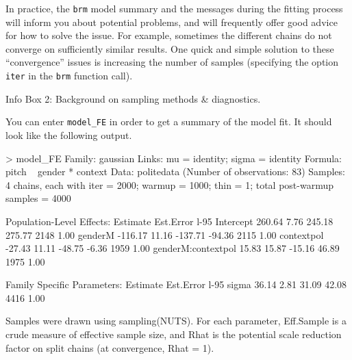 \documentclass[nobib]{tufte-handout}
\begin{document}
\begin{InfoBox}[]
{\begin{minipage}{1\textwidth}
    \medskip
  
    In practice, the \texttt{brm} model summary and the messages during the fitting process will inform you about potential problems, and will frequently offer good advice for how to solve the issue. 
   For example, sometimes the different chains do not converge on sufficiently similar results. 
    One quick and simple solution to these ``convergence'' issues is increasing the number of samples (specifying the option \texttt{iter} in the \texttt{brm} function call).
   
  \end{minipage} \par
  } \par
  \begin{center}
    Info Box 2: Background on sampling methods \& diagnostics.
  \end{center}
\end{InfoBox}


You can enter \texttt{model\_FE} in order to get a summary of the model fit. It should look like the following output.

\bigskip

\begin{minipage}[]{1.2\textwidth}
\begin{rc}
> model_FE
 Family: gaussian 
  Links: mu = identity; sigma = identity 
Formula: pitch ~ gender * context 
   Data: politedata (Number of observations: 83) 
Samples: 4 chains, each with iter = 2000; warmup = 1000; thin = 1;
         total post-warmup samples = 4000

Population-Level Effects: 
                   Estimate Est.Error l-95%
Intercept            260.64      7.76   245.18   275.77       2148 1.00
genderM             -116.17     11.16  -137.71   -94.36       2115 1.00
contextpol           -27.43     11.11   -48.75    -6.36       1959 1.00
genderM:contextpol    15.83     15.87   -15.16    46.89       1975 1.00

Family Specific Parameters: 
      Estimate Est.Error l-95%
sigma    36.14      2.81    31.09    42.08       4416 1.00

Samples were drawn using sampling(NUTS). For each parameter, Eff.Sample 
is a crude measure of effective sample size, and Rhat is the potential 
scale reduction factor on split chains (at convergence, Rhat = 1).
\end{rc}
\end{minipage}
\end{document}
